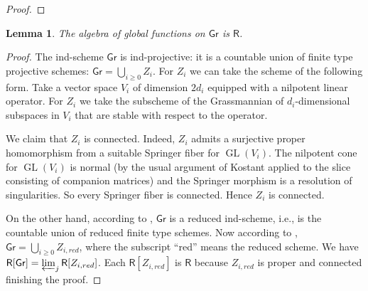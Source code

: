\documentclass{amsart}
\newtheorem{Lem}[Thm]{Lemma}
\theoremstyle{definition}
\newcommand{\Ring}{\mathsf{R}}
\newcommand{\g}{\mathfrak{g}}
\newcommand{\Z}{\mathbb{Z}}
\numberwithin{equation}{section}
\begin{document}
\begin{proof}
%
%
\end{proof}

\begin{Lem}\label{Lem:aff_Gr_integral}
The algebra of global functions on $\mathsf{Gr}$ is $\Ring$.
\end{Lem}
\begin{proof}
The ind-scheme $\mathsf{Gr}$ is ind-projective: it is a countable union of finite type projective schemes: 
$\mathsf{Gr}=\bigcup_{i\geqslant 0}Z_i$. For $Z_i$ we can take the scheme of the following form. Take a vector space $V_i$ of dimension $2d_i$ equipped with a nilpotent linear operator. For $Z_i$ we take the subscheme of the Grassmannian of $d_i$-dimensional subspaces in $V_i$ that are stable with respect to the operator. 

We claim that $Z_i$ is connected. Indeed, $Z_i$ admits a surjective proper homomorphism from a suitable Springer fiber for $\operatorname{GL}(V_i)$. The nilpotent cone for $\operatorname{GL}(V_i)$ is normal (by the usual argument of Kostant applied to the slice consisting of companion matrices) and the Springer morphism is a resolution of singularities. So every Springer fiber is connected. Hence $Z_i$ is connected.


On the other hand, according to \cite[Theorem 6.1]{PR}, $\mathsf{Gr}$ is a reduced ind-scheme, i.e., is the countable union of reduced finite type schemes.  Now according to \cite[Lemma 6.3]{Beauville_Laszlo},   $\mathsf{Gr}=\bigcup_{i\geqslant 0}Z_{i,red}$, where the subscript ``red'' means the reduced scheme. We have $\Ring[\mathsf{Gr}]=\varprojlim_j \Ring[Z_{i,red}]$. Each $\Ring[Z_{i,red}]$ is $\Ring$ because $Z_{i,red}$ is proper and connected finishing the proof. 
\end{proof}

\end{document}
